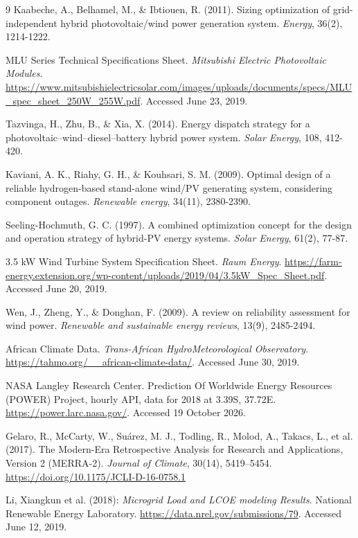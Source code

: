 \documentclass[final,3p,times]{elsarticle}
\begin{document}
\begin{thebibliography}{9}
Kaabeche, A., Belhamel, M., \& Ibtiouen, R. (2011). Sizing optimization of grid-independent hybrid photovoltaic/wind power generation system. \textit{Energy}, 36(2), 1214-1222.

MLU Series Technical Specifications Sheet. \textit{Mitsubishi Electric Photovoltaic Modules}. \url{https://www.mitsubishielectricsolar.com/images/uploads/documents/specs/MLU_spec_sheet_250W_255W.pdf}. Accessed June 23, 2019.

Tazvinga, H., Zhu, B., \& Xia, X. (2014). Energy dispatch strategy for a photovoltaic–wind–diesel–battery hybrid power system. \textit{Solar Energy}, 108, 412-420.

Kaviani, A. K., Riahy, G. H., \& Kouhsari, S. M. (2009). Optimal design of a reliable hydrogen-based stand-alone wind/PV generating system, considering component outages. \textit{Renewable energy}, 34(11), 2380-2390.

Seeling-Hochmuth, G. C. (1997). A combined optimization concept for the design and operation strategy of hybrid-PV energy systems. \textit{Solar Energy}, 61(2), 77-87.

3.5 kW Wind Turbine System Specification Sheet. \textit{Raum Energy}. \url{https://farm-energy.extension.org/wp-content/uploads/2019/04/3.5kW_Spec_Sheet.pdf}. Accessed June 20, 2019.

Wen, J., Zheng, Y., \& Donghan, F. (2009). A review on reliability assessment for wind power. \textit{Renewable and sustainable energy reviews}, 13(9), 2485-2494.

African Climate Data. \textit{Trans-African HydroMeteorological Observatory}.
\url{https://tahmo.org/__african-climate-data/}. Accessed June 30, 2019.

NASA Langley Research Center. Prediction Of Worldwide Energy Resources (POWER) Project, hourly API, data for 2018 at 3.39\degree S, 37.72\degree E. \url{https://power.larc.nasa.gov/}. Accessed 19 October 2026.

Gelaro, R., McCarty, W., Su\'{a}rez, M. J., Todling, R., Molod, A., Takacs, L., et al. (2017). The Modern-Era Retrospective Analysis for Research and Applications, Version 2 (MERRA-2). \textit{Journal of Climate}, 30(14), 5419--5454. \url{https://doi.org/10.1175/JCLI-D-16-0758.1}

Li, Xiangkun et al. (2018): \textit{Microgrid Load and LCOE modeling Results}. National Renewable Energy Laboratory. \url{https://data.nrel.gov/submissions/79}. Accessed June 12, 2019.


\end{thebibliography}
\end{document}
